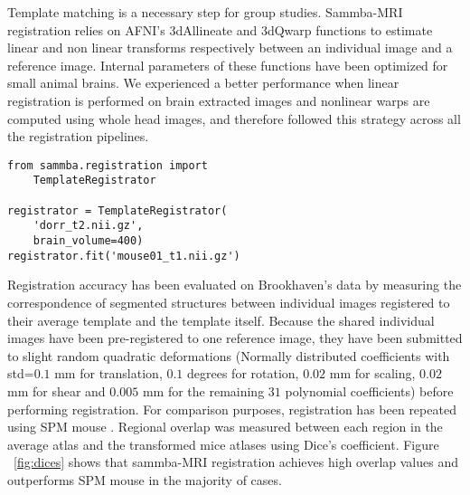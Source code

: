 \documentclass[utf8, a4paper, final, crop]{frontiersSCNS} %
\begin{document}
Template matching is a necessary step for group studies.
%
%
Sammba-MRI registration relies on AFNI's 3dAllineate and 3dQwarp functions to 
estimate linear and non linear transforms respectively between an individual image
and a reference image. Internal parameters of these functions have been optimized for
small animal brains.
We experienced a better performance when linear registration
is performed on brain extracted images and nonlinear warps are computed
using whole head images, and therefore followed this strategy across all the 
registration pipelines.
\begin{verbatim}
from sammba.registration import 
    TemplateRegistrator

registrator = TemplateRegistrator(
    'dorr_t2.nii.gz',
    brain_volume=400)
registrator.fit('mouse01_t1.nii.gz')
\end{verbatim}

Registration accuracy has been evaluated on Brookhaven's data \citep{ma2008vivo} by 
measuring the correspondence of segmented structures between individual images 
registered 
to their average template and the template itself.
Because the shared individual images have been pre-registered to one reference image, 
they have been submitted to slight random quadratic deformations (Normally 
distributed coefficients with std=$0.1$ mm for translation, $0.1$ degrees for 
rotation, $0.02$ mm for scaling, $0.02$ mm for shear and $0.005$ mm for the remaining $31$ polynomial coefficients) before performing registration.
%
For comparison purposes, registration has been repeated using SPM mouse \citep{sawiak2009spmmouse}.
Regional overlap was measured
between each region in the average atlas and the transformed mice atlases 
using Dice's coefficient.
Figure ~\ref{fig:dices} shows that sammba-MRI registration achieves
high overlap values and outperforms SPM mouse in the majority of cases.
\end{document}

